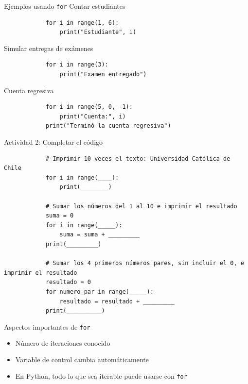 \documentclass{beamer}
\begin{document}
    \begin{frame}[fragile,t]{Ejemplos usando \texttt{for}}
        Contar estudiantes
        \begin{verbatim}
            for i in range(1, 6):
                print("Estudiante", i)
        \end{verbatim}
        Simular entregas de exámenes
        \begin{verbatim}
            for i in range(3):
                print("Examen entregado")
        \end{verbatim}
        Cuenta regresiva
        \begin{verbatim}
            for i in range(5, 0, -1):
                print("Cuenta:", i)
            print("Terminó la cuenta regresiva")
        \end{verbatim}
    \end{frame}

    \begin{frame}[fragile,t]{Actividad 2: Completar el código}
        \begin{verbatim}
            # Imprimir 10 veces el texto: Universidad Católica de Chile
            for i in range(____):
                print(________)

            # Sumar los números del 1 al 10 e imprimir el resultado
            suma = 0
            for i in range(_____):
                suma = suma + _________
            print(_________)

            # Sumar los 4 primeros números pares, sin incluir el 0, e imprimir el resultado
            resultado = 0
            for numero_par in range(_____):
                resultado = resultado + _________
            print(__________)
        \end{verbatim}
    \end{frame}

    \begin{frame}{Aspectos importantes de \texttt{for}}
        \begin{itemize}
            \item Número de iteraciones conocido
            \item Variable de control cambia automáticamente
            \item En Python, todo lo que sea iterable puede usarse con \texttt{for}
        \end{itemize}
    \end{frame}
\end{document}
